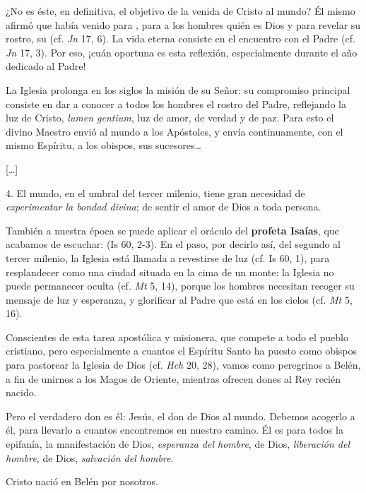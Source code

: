 ¿No es éste, en definitiva, el objetivo de la venida de Cristo al mundo? Él mismo afirmó que había venido para , para  a los hombres quién es Dios y para revelar su rostro, su  (cf. \emph{Jn} 17, 6). La vida eterna consiste en el encuentro con el Padre (cf. \emph{Jn} 17, 3). Por eso, ¡cuán oportuna es esta reflexión, especialmente durante el año dedicado al Padre!

La Iglesia prolonga en los siglos la misión de su Señor: su compromiso principal consiste en dar a conocer a todos los hombres el rostro del Padre, reflejando la luz de Cristo, \emph{lumen gentium}, luz de amor, de verdad y de paz. Para esto el divino Maestro envió al mundo a los Apóstoles, y envía continuamente, con el mismo Espíritu, a los obispos, sus sucesores\ldots{}

{[}\ldots{}{]}

4. El mundo, en el umbral del tercer milenio, tiene gran necesidad de \emph{experimentar la bondad divina}; de sentir el amor de Dios a toda persona.

También a nuestra época se puede aplicar el oráculo del \textbf{profeta Isaías}, que acabamos de escuchar:  (Is 60, 2-3). En el paso, por decirlo así, del segundo al tercer milenio, la Iglesia está llamada a revestirse de luz (cf. Is 60, 1), para resplandecer como una ciudad situada en la cima de un monte: la Iglesia no puede permanecer oculta (cf. \emph{Mt} 5, 14), porque los hombres necesitan recoger su mensaje de luz y esperanza, y glorificar al Padre que está en los cielos (cf. \emph{Mt} 5, 16).

Conscientes de esta tarea apostólica y misionera, que compete a todo el pueblo cristiano, pero especialmente a cuantos el Espíritu Santo ha puesto como obispos para pastorear la Iglesia de Dios (cf. \emph{Hch} 20, 28), vamos como peregrinos a Belén, a fin de unirnos a los Magos de Oriente, mientras ofrecen dones al Rey recién nacido.

Pero el verdadero don es él: Jesús, el don de Dios al mundo. Debemos acogerlo a él, para llevarlo a cuantos encontremos en nuestro camino. Él es para todos la epifanía, la manifestación de Dios, \emph{esperanza del hombre}, de Dios, \emph{liberación del hombre}, de Dios, \emph{salvación del hombre}.

Cristo nació en Belén por nosotros.

